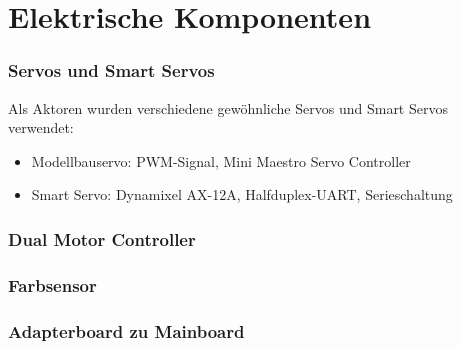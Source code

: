 \section{Elektrische Komponenten}

\begin{frame}
	\frametitle{Servos und Smart Servos}
	Als Aktoren wurden verschiedene gewöhnliche Servos und Smart Servos verwendet:
	\begin{itemize}
		\item Modellbauservo: PWM-Signal, Mini Maestro Servo Controller
		\item Smart Servo: Dynamixel AX-12A, Halfduplex-UART, Serieschaltung
	\end{itemize}
	
\end{frame}

\begin{frame}
	\frametitle{Dual Motor Controller}
	
\end{frame}

\begin{frame}
	\frametitle{Farbsensor}
	
\end{frame}

\begin{frame}
	\frametitle{Adapterboard zu Mainboard}
	
\end{frame}